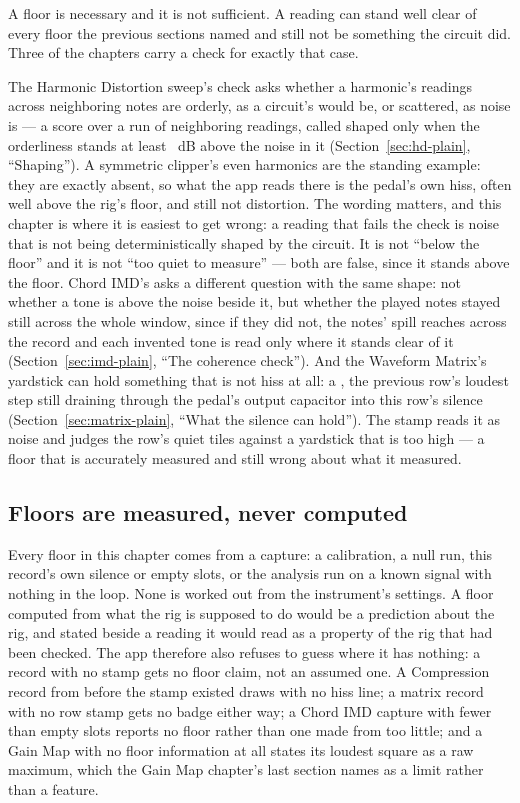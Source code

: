 \documentclass[11pt,a4paper]{article}
\begin{document}
A floor is necessary and it is not sufficient. A reading can stand well
clear of every floor the previous sections named and still not be
something the circuit did. Three of the chapters carry a check for
exactly that case.

The Harmonic Distortion sweep's  check asks whether a
harmonic's readings across neighboring notes are orderly, as a
circuit's would be, or scattered, as noise is --- a 
score over a run of neighboring readings, called shaped only when the
orderliness stands at least \hdShapedSNRDB{}~dB above the noise in it
(Section~\ref{sec:hd-plain}, ``Shaping''). A symmetric clipper's even
harmonics are the standing example: they are exactly absent, so what the
app reads there is the pedal's own hiss, often well above the rig's floor,
and still not distortion. The wording matters, and this chapter is where
it is easiest to get wrong: a reading that fails the check is noise that
is not being deterministically shaped by the circuit. It is not ``below
the floor'' and it is not ``too quiet to measure'' --- both are false,
since it stands above the floor. Chord IMD's  asks
a different question with the same shape: not whether a tone is above
the noise beside it, but whether the played notes stayed still across
the whole window, since if they did not, the notes' spill reaches across
the record and each invented tone is read only where it stands clear of
it (Section~\ref{sec:imd-plain}, ``The coherence check''). And the Waveform
Matrix's yardstick can hold something that is not hiss at all: a
, the previous row's loudest step still draining through
the pedal's output capacitor into this row's silence
(Section~\ref{sec:matrix-plain}, ``What the silence can hold''). The
stamp reads it as noise and judges the row's quiet tiles against a
yardstick that is too high --- a floor that is accurately measured and
still wrong about what it measured.

\subsection{Floors are measured, never computed}

Every floor in this chapter comes from a capture: a calibration, a null
run, this record's own silence or empty slots, or the analysis run on a
known signal with nothing in the loop. None is worked out from the
instrument's settings. A floor computed from what the rig is supposed to
do would be a prediction about the rig, and stated beside a reading it
would read as a property of the rig that had been checked. The app
therefore also refuses to guess where it has nothing: a record with no
stamp gets no floor claim, not an assumed one. A Compression record from
before the stamp existed draws with no hiss line; a matrix record with no
row stamp gets no badge either way; a Chord IMD capture with fewer than
\imdMinimumFloorSamples{} empty slots reports no floor rather than one
made from too little; and a Gain Map with no floor information at all
states its loudest square as a raw maximum, which the Gain Map chapter's
last section names as a limit rather than a feature.
\end{document}
